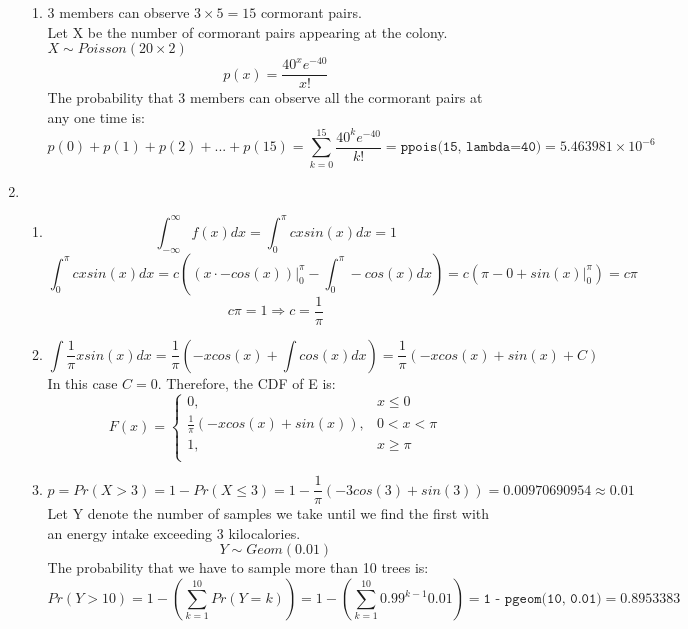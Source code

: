 \documentclass[11pt]{article}
\begin{document}
\begin{enumerate}[label=\textbf{Question \arabic*:},start=1]
\begin{enumerate}
\item 
3 members can observe $3 \times 5 = 15$ cormorant pairs.\\
Let X be the number of cormorant pairs appearing at the colony. \( X \sim Poisson(20 \times 2) \) \\
\[
p(x) = \frac{40^x e^{-40}}{x!}
\]
The probability that 3 members can observe all the cormorant pairs at any one time is:
\[
p(0) + p(1) + p(2) + ... + p(15) = \sum_{k=0}^{15} \frac{40^k e^{-40}}{k!} = \texttt{ppois(15, lambda=40)} = 5.463981 \times 10^{-6}
\]

\end{enumerate}




\item 
\begin{enumerate}
  \item 
\[
\int_{-\infty}^{\infty} f(x) dx = \int_{0}^{\pi} cx sin(x) dx = 1
\]
\[
 \int_{0}^{\pi} cx sin(x) dx = c( (x \cdot -cos(x))|_{0}^{\pi} - \int_{0}^{\pi} -cos(x)dx ) = c (\pi - 0 + sin(x) |_{0}^{\pi}) = c \pi
\]
\[
c \pi = 1 \Rightarrow c = \frac{1}{\pi}
\]

  \item 
\[
 \int \frac{1}{\pi} x sin(x) dx = \frac{1}{\pi}( -xcos(x) + \int cos(x)dx ) = \frac{1}{\pi} (-xcos(x) + sin(x) + C)
\]
In this case $C = 0$. Therefore, the CDF of E is:
\[
F(x) = \begin{cases}
        0, & x \leq 0\\
        \frac{1}{\pi} (-xcos(x) + sin(x)), & 0 < x < \pi\\
        1, & x \ge \pi\\
        \end{cases}
\]


  \item 
\[
p = Pr(X > 3) = 1 - Pr(X \leq 3) = 1 - \frac{1}{\pi}(-3 cos(3) + sin(3)) = 0.00970690954 \approx 0.01
\]
Let Y denote the number of samples we take until we find the first with an energy intake exceeding 3 kilocalories. \\
\[
Y \sim Geom(0.01)
\]
The probability that we have to sample more than 10 trees is:
\[
Pr(Y > 10) = 1 - (\sum_{k=1}^{10} Pr(Y = k) ) = 1 - (\sum_{k=1}^{10} 0.99^{k-1} 0.01) = \texttt{1 - pgeom(10, 0.01)} = 0.8953383
\]



\end{enumerate}

\end{enumerate}
\end{document}
